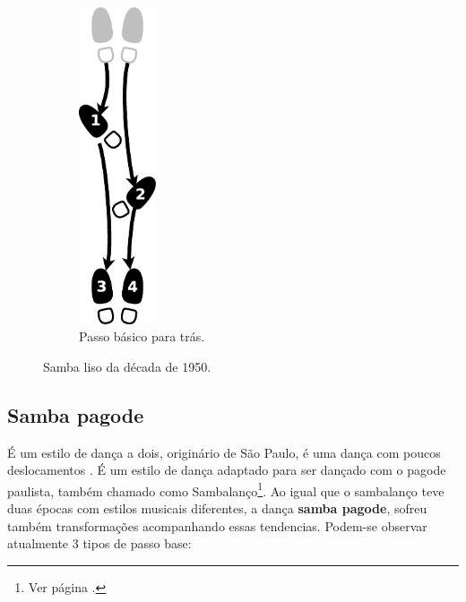 \begin{figure}[h]
    \begin{subfigure}[b]{0.4\textwidth}
        \centering
	\includegraphics[width=0.25\textwidth]{chapters/cap-historia-dancasamba/samba-liso-basico-tras.eps}
        \caption{Passo básico para trás.}
        \label{fig:samba-liso-basico-tras}
    \end{subfigure}
    \caption{Samba liso da década de 1950.}\label{fig:samba-liso-basico}
\end{figure}

\subsection{Samba pagode} 
É um estilo de dança a dois, originário de São Paulo, 
é uma dança com poucos deslocamentos \cite[pp. 134]{perna2002samba}.
É um estilo de dança adaptado para ser dançado com o pagode paulista,
também chamado como Sambalanço\footnote{Ver página \pageref{ref:sambalanco}.}.
Ao igual que o sambalanço teve duas épocas com estilos musicais diferentes,
a dança \textbf{samba pagode}, sofreu também transformações acompanhando essas tendencias.
Podem-se observar atualmente 3 tipos de passo base: 

